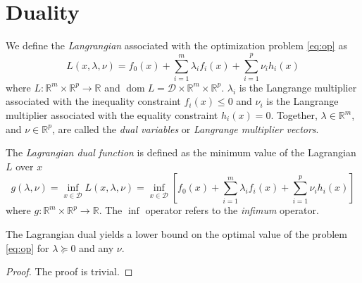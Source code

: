 
\section{Duality}
We define the \emph{Langrangian} associated with the optimization problem \eqref{eq:op} as
\begin{equation}
L(x, \lambda, \nu) = f_0(x) + \sum_{i=1}^m \lambda_i f_i(x)
  + \sum_{i=1}^p \nu_i h_i(x)
\end{equation}
where $L: \mathbb{R}^m \times \mathbb{R}^p \rightarrow \mathbb{R}$ and $\operatorname{dom} L = \mathcal{D} \times \mathbb{R}^m \times \mathbb{R}^p$. $\lambda_i$ is the Langrange multiplier associated with the inequality constraint $f_i(x) \leq 0$ and $\nu_i$ is the Langrange multiplier associated with the equality constraint $h_i(x) = 0$. Together, $\lambda \in \mathbb{R}^m$, and $\nu \in \mathbb{R}^p$, are called the \emph{dual variables} or \emph{Langrange multiplier vectors}.

The \emph{Lagrangian dual function} is defined as the minimum value of the Lagrangian $L$ over $x$
\begin{equation}
g(\lambda, \nu) = \inf_{x \in \mathcal{D}} L(x, \lambda, \nu)
  = \inf_{x \in \mathcal{D}} \left[ f_0(x) + \sum_{i=1}^m \lambda_i f_i(x)
    + \sum_{i=1}^p \nu_i h_i(x) \right]
\end{equation}
where $g: \mathbb{R}^m \times \mathbb{R}^p \rightarrow \mathbb{R}$. The $\inf$ operator refers to the \emph{infimum} operator.

\begin{theorem}
  The Lagrangian dual yields a lower bound on the optimal value of the problem \eqref{eq:op} for $\lambda \succeq 0$ and any $\nu$.
\end{theorem}
\begin{proof}
  The proof is trivial.
\end{proof}

